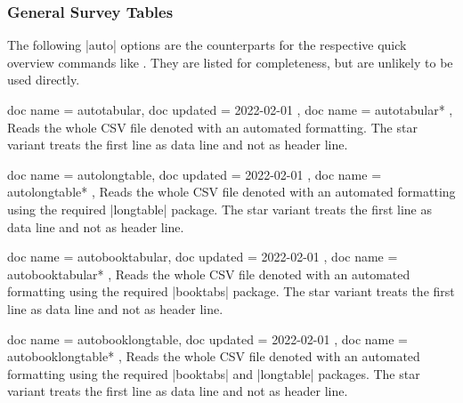 \documentclass[a4paper,11pt]{ltxdoc}
\begin{document}
\clearpage
\subsubsection{General Survey Tables}\label{subsubsec:table_survey}

The following |auto| options are the counterparts for the respective quick
overview commands like . They are listed for
completeness, but are unlikely to be used directly.

\begin{docCsvKeys}[
    doc parameter   = {=\meta{file name}},
    doc description = no default,
  ]
  {
    { doc name = autotabular, doc updated = {2022-02-01} },
    { doc name = autotabular* },
  }
  Reads the whole CSV file denoted  with an automated formatting.
  The star variant treats the first line as data line and not as header line.
\end{docCsvKeys}


\begin{docCsvKeys}[
    doc parameter   = {=\meta{file name}},
    doc description = no default,
  ]
  {
    { doc name = autolongtable, doc updated = {2022-02-01}  },
    { doc name = autolongtable* },
  }
  Reads the whole CSV file denoted  with an automated formatting
  using the required |longtable| package.
  The star variant treats the first line as data line and not as header line.
\end{docCsvKeys}


\begin{docCsvKeys}[
    doc parameter   = {=\meta{file name}},
    doc description = no default,
  ]
  {
    { doc name = autobooktabular, doc updated = {2022-02-01}  },
    { doc name = autobooktabular* },
  }
  Reads the whole CSV file denoted  with an automated formatting
  using the required |booktabs| package.
  The star variant treats the first line as data line and not as header line.
\end{docCsvKeys}


\begin{docCsvKeys}[
    doc parameter   = {=\meta{file name}},
    doc description = no default,
  ]
  {
    { doc name = autobooklongtable, doc updated = {2022-02-01}  },
    { doc name = autobooklongtable* },
  }
  Reads the whole CSV file denoted  with an automated formatting
  using the required |booktabs| and |longtable| packages.
  The star variant treats the first line as data line and not as header line.
\end{docCsvKeys}
\end{document}
